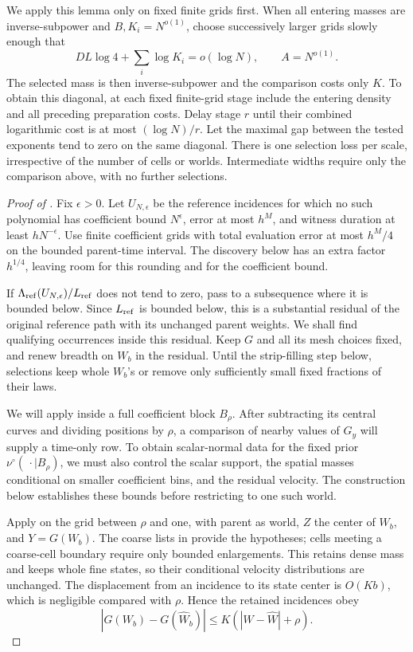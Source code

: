 We apply this lemma only on fixed finite grids first. When all
entering masses are inverse-subpower and \(B,K_i=N^{o(1)}\), choose
successively larger grids slowly enough that
\[
 DL\log4+\sum_i\log K_i=o(\log N),\qquad A=N^{o(1)}.
\]
The selected mass is then inverse-subpower and the comparison costs
only \(K\). To obtain this diagonal, at each fixed finite-grid stage
include the entering density and all preceding preparation costs.
Delay stage \(r\) until their combined logarithmic cost is at most
\((\log N)/r\). Let the maximal gap between the tested exponents tend
to zero on the same diagonal. There is one selection loss per
scale, irrespective of the number of cells or worlds. Intermediate
widths require only the comparison above, with no further selections.

\begin{proof}[Proof of ]
Fix \(\epsilon>0\). Let \(U_{N,\epsilon}\) be the reference
incidences for which no such polynomial has coefficient bound
\(N^\epsilon\), error at most \(h^M\), and witness duration at
least \(hN^{-\epsilon}\). Use finite coefficient grids with total
evaluation error at most \(h^M/4\) on the bounded parent-time
interval. The discovery below has an extra factor \(h^{1/4}\),
leaving room for this rounding and for the coefficient bound.

If \(\Lambda_{\rm ref}(U_{N,\epsilon})/L_{\rm ref}\) does not
tend to zero, pass to a subsequence where it is bounded below.
Since \(L_{\rm ref}\) is bounded below, this is a substantial
residual of the original reference path with its unchanged parent
weights. We shall find qualifying occurrences inside this residual.
Keep \(G\) and all its mesh choices fixed, and renew breadth on
\(W_b\) in the residual. Until the
strip-filling step below, selections keep whole \(W_b\)'s or remove
only sufficiently small fixed fractions of their laws.

We will apply  inside a full coefficient
block \(B_\rho\). After subtracting its central curves and dividing
positions by \(\rho\), a comparison of nearby values of \(G_y\)
will supply a time-only row. To obtain scalar-normal data for the
fixed prior \(\nu^\circ(\,\cdot\mid B_\rho)\), we must also
control the scalar support, the spatial masses conditional on smaller
coefficient bins, and the residual velocity. The construction below
establishes these bounds before restricting to one such world.

Apply  on the grid between \(\rho\)
and one, with parent as world, \(Z\) the center of \(W_b\), and
\(Y=G(W_b)\). The coarse lists in  provide
the hypotheses; cells meeting a coarse-cell boundary require only
bounded enlargements. This retains dense mass and keeps whole fine
states, so their conditional velocity distributions are unchanged.
The displacement from an incidence to its state center is \(O(Kb)\),
which is negligible compared with \(\rho\). Hence the retained
incidences obey
\begin{equation}\label{a05:field-lipschitz}
 |G(W_b)-G(\widehat W_b)|
       \leq K(|W-\widehat W|+\rho).
\end{equation}


\end{proof}
